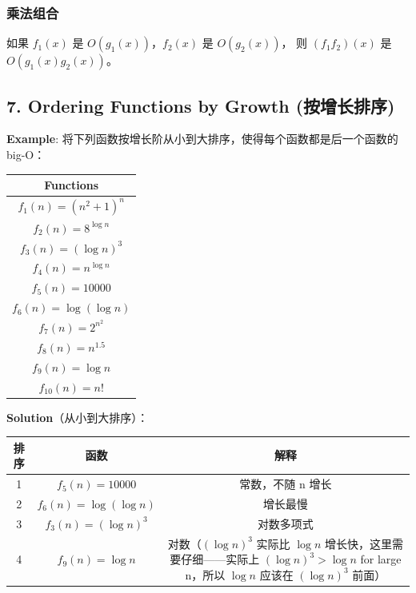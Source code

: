 \documentclass[10pt,a4paper,openany]{ctexbook}
\theoremstyle{definition}
\theoremstyle{remark}
\renewenvironment{quote}
  {\list{}{\leftmargin=1em\rightmargin=0pt\topsep=0.5pt\partopsep=0pt}\item[]}
  {\endlist}
\begin{document}
\subsubsection{乘法组合}

\begin{quote}
如果 $f_1(x)$ 是 $O(g_1(x))$，$f_2(x)$ 是 $O(g_2(x))$，
则 $(f_1 f_2)(x)$ 是 $O(g_1(x) g_2(x))$。

\end{quote}
\vspace{-2pt}

\subsection{7. Ordering Functions by Growth (按增长排序)}

\textbf{Example}: 将下列函数按增长阶从小到大排序，使得每个函数都是后一个函数的 big-O：
\begin{center}
\begin{tabular}{c}
\hline
Functions \\ \hline
$f_1(n) = (n^2+1)^n$ \\
$f_2(n) = 8^{\log n}$ \\
$f_3(n) = (\log n)^3$ \\
$f_4(n) = n^{\log n}$ \\
$f_5(n) = 10000$ \\
$f_6(n) = \log(\log n)$ \\
$f_7(n) = 2^{n^2}$ \\
$f_8(n) = n^{1.5}$ \\
$f_9(n) = \log n$ \\
$f_{10}(n) = n!$ \\
\hline
\end{tabular}

\end{center}

\textbf{Solution}（从小到大排序）：
\begin{center}
\begin{tabular}{ccc}
\hline
排序 & 函数 & 解释 \\ \hline
1 & $f_5(n) = 10000$ & 常数，不随 n 增长 \\
2 & $f_6(n) = \log(\log n)$ & 增长最慢 \\
3 & $f_3(n) = (\log n)^3$ & 对数多项式 \\
4 & $f_9(n) = \log n$ & 对数（$(\log n)^3$ 实际比 $\log n$ 增长快，这里需要仔细——实际上 $(\log n)^3 > \log n$ for large n，所以 $\log n$ 应该在 $(\log n)^3$ 前面） \\
\hline
\end{tabular}

\end{center}
\end{document}
